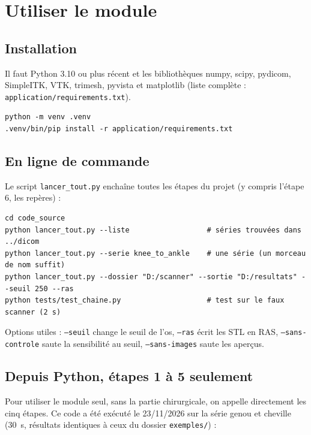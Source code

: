 \documentclass[11pt,a4paper]{article}
\newcommand{\fichier}[1]{\texttt{\small #1}}
\begin{document}
\section{Utiliser le module}
\label{sec-utiliser}

\subsection{Installation}

Il faut Python 3.10 ou plus récent et les bibliothèques numpy, scipy, pydicom, SimpleITK, VTK, trimesh, pyvista et
matplotlib (liste complète : \fichier{application/requirements.txt}).

\begin{Verbatim}
python -m venv .venv
.venv/bin/pip install -r application/requirements.txt
\end{Verbatim}

\subsection{En ligne de commande}

Le script \fichier{lancer\_tout.py} enchaîne toutes les étapes du projet (y compris l'étape 6, les repères) :

\begin{Verbatim}
cd code_source
python lancer_tout.py --liste                  # séries trouvées dans ../dicom
python lancer_tout.py --serie knee_to_ankle    # une série (un morceau de nom suffit)
python lancer_tout.py --dossier "D:/scanner" --sortie "D:/resultats" --seuil 250 --ras
python tests/test_chaine.py                    # test sur le faux scanner (2 s)
\end{Verbatim}

Options utiles : \texttt{--seuil} change le seuil de l'os, \texttt{--ras} écrit les STL en RAS,
\texttt{--sans-controle} saute la sensibilité au seuil, \texttt{--sans-images} saute les aperçus.

\subsection{Depuis Python, étapes 1 à 5 seulement}

Pour utiliser le module seul, sans la partie chirurgicale, on appelle directement les cinq étapes. Ce code a été
exécuté le 23/11/2026 sur la série genou et cheville (30~s, résultats identiques à ceux du dossier \fichier{exemples/}) :
\end{document}
